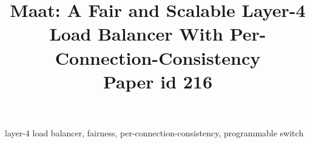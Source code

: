 \documentclass[conference]{IEEEtran}
\begin{document}
\title{Maat: A Fair and Scalable Layer-4 Load Balancer With Per-Connection-Consistency\\
	Paper id 216
}


\maketitle



\begin{IEEEkeywords}
layer-4 load balancer, fairness, per-connection-consistency, programmable switch
\end{IEEEkeywords}














\end{document}
